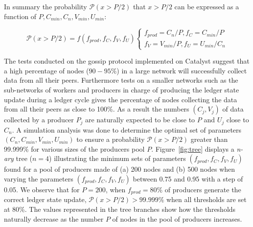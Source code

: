 In summary the probability $\mathcal{P}(x>P/2)$ that $x >P/2$ can be expressed as a function of $P, C_{min} ,C_n, V_{min}, U_{min}$:
\begin{center}
\[
  \mathcal{P}(x>P/2) = f(f_{prod}, f_C, f_V, f_U)\begin{cases}
               f_{prod} = C_n/P, f_C = C_{min}/P\\
               f_V = V_{min}/P, f_{U} = U_{min}/C_n
            \end{cases}
\]
\end{center}
The tests conducted on the gossip protocol implemented on Catalyst suggest that a high percentage of nodes ($90-95\%$) in a large network will successfully collect data from all their peers. Furthermore tests on a smaller networks such as the sub-networks  of workers and producers in charge of producing the ledger state update during a ledger cycle gives the percentage of nodes collecting the data from all their peers as close to 100\%. As a result the numbers $(C_{j} ,V_{j})$ of data collected by a producer $P_j$ are naturally expected to be close to $P$ and $U_j$ close to $C_n$. A simulation analysis was done to determine the optimal set of parameters $(C_n, C_{min}, V_{min}, U_{min})$ to ensure a probability $\mathcal{P}(x>P/2)$ greater than 99.999\% for various sizes of the producers pool $P$.
Figure~\ref{fig:tree} displays a \textit{n-ary} tree ($n=4$) illustrating the minimum sets of parameters $(f_{prod}, f_C, f_V, f_U)$ found for a pool of producers made of (a) 200 nodes and (b) 500 nodes when varying the parameters $(f_{prod}, f_C, f_V, f_U)$ between 0.75 and 0.95 with a step of 0.05. We observe that for $P = 200$, when $f_{prod}=80\%$ of producers generate the correct ledger state update, $\mathcal{P}(x>P/2) > 99.999\%$ when all thresholds are set at 80\%. The values represented in the tree branches show how the thresholds naturally decrease as the number $P$ of nodes in the pool of producers increases.


